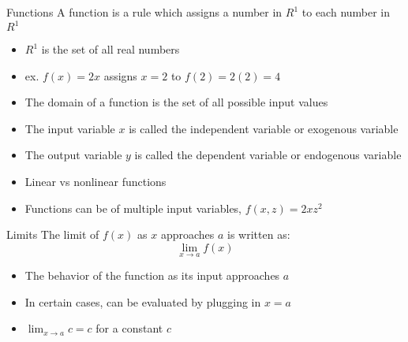 \documentclass[aspectratio=169]{beamer}
\begin{document}
\begin{frame}{Functions}\label{main1}
	A function is a rule which assigns a number in $R^1$ to each number in $R^1$
\begin{itemize}
\begin{itemize}
	\item $R^1$ is the set of all real numbers
	\item ex. $f(x) = 2x$ assigns $x = 2$ to $f(2) = 2(2) = 4$
	\item The domain of a function is the set of all possible input values
	\item The input variable $x$ is called the independent variable or exogenous variable
	\item The output variable $y$ is called the dependent variable or endogenous variable
	\item Linear vs nonlinear functions
	\item Functions can be of multiple input variables, $f(x,z) = 2xz^{2}$
\end{itemize}
\end{itemize}

\end{frame}

\begin{frame}{Limits}\label{main1}
	The limit of \( f(x) \) as \( x \) approaches \( a \) is written as:
\[
\lim_{x \to a} f(x)
\]
\begin{itemize}
\begin{itemize}
	\item The behavior of the function as its input approaches \( a \)
	\item In certain cases, can be evaluated by plugging in \( x = a \)
	\item \( \lim_{x \to a} c = c \) for a constant \( c \)
\end{itemize}
\end{itemize}

\end{frame}
\end{document}
